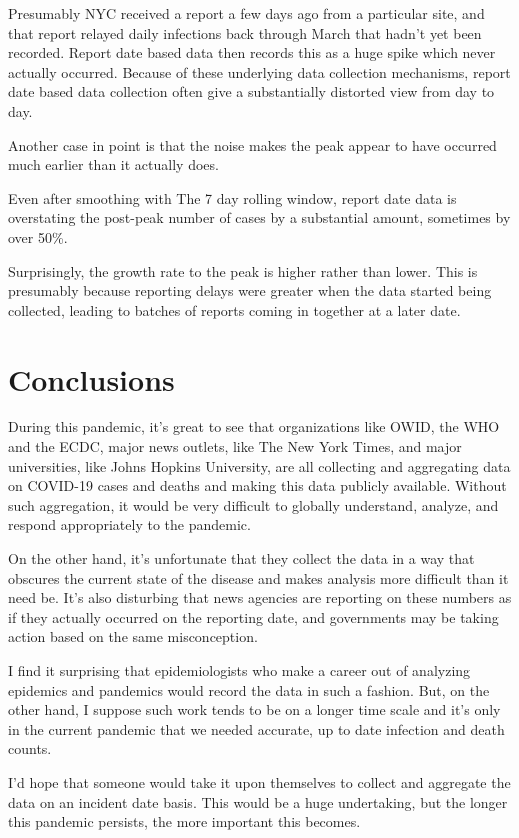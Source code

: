 \documentclass[10pt,reqno]{amsart}
\begin{document}
Presumably NYC received a report a few days ago from a particular
site, and that report relayed daily infections back through March that
hadn't yet been recorded.  Report date based data then records this as
a huge spike which never actually occurred.  Because of these
underlying data collection mechanisms, report date based data
collection often give a substantially distorted view from day to day.

Another case in point is that the noise makes the peak appear to have
occurred much earlier than it actually does.

Even after smoothing with The 7 day rolling window, report date data is
overstating the post-peak number of cases by a substantial amount,
sometimes by over 50\%.

Surprisingly, the growth rate to the peak is higher rather than lower.
This is presumably because reporting delays were greater when the data
started being collected, leading to batches of reports coming in
together at a later date.

\section{Conclusions}
During this pandemic, it's great to see that organizations like OWID, the
WHO and the ECDC, major news outlets, like The New York Times, and
major universities, like Johns Hopkins University, are all collecting
and aggregating data on COVID-19 cases and deaths and making this data
publicly available.  Without such aggregation, it would be very
difficult to globally understand, analyze, and respond appropriately
to the pandemic.

On the other hand, it's unfortunate that they collect the data in a
way that obscures the current state of the disease and makes analysis
more difficult than it need be.  It's also disturbing that news
agencies are reporting on these numbers as if they actually occurred
on the reporting date, and governments may be taking action based on
the same misconception.

I find it surprising that epidemiologists who make a career out of
analyzing epidemics and pandemics would record the data in such a
fashion.  But, on the other hand, I suppose such work tends to be on a
longer time scale and it's only in the current pandemic that we needed
accurate, up to date infection and death counts.

I'd hope that someone would take it upon themselves to
collect and aggregate the data on an incident date basis.  This would
be a huge undertaking, but the longer this pandemic persists, the more
important this becomes.

\printbibliography
\end{document}
